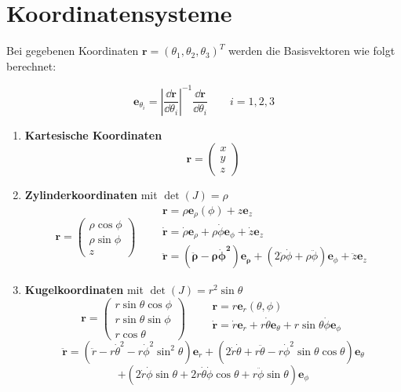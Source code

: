 \section{Koordinatensysteme}

\begin{frameddefn}[Basisvektoren]

Bei gegebenen Koordinaten $\mathbf{r} = ( \theta_1, \theta_2, \theta_3 )^T$ werden die Basisvektoren wie folgt berechnet:

\[ \mathbf{e}_{\theta_{i}} = \left| \frac{\dd \mathbf{r}}{\dd \theta_i} \right|^{-1} \frac{\dd \mathbf{r}}{\dd \theta_i} \qquad i = 1,2,3 \]
	
\end{frameddefn}

\begin{frameddefn}[Koordinatendarstellungen]

\begin{enumerate}
	\item \textbf{Kartesische Koordinaten} \[ \mathbf{r} = \left(\begin{array}{c} x \\ y \\ z \end{array} \right) \]
	\item \textbf{Zylinderkoordinaten} mit $\det(J) = \rho$ \[ \mathbf{r} = \left(\begin{array}{c} \rho \cos \phi \\ \rho \sin \phi \\ z \end{array} \right) \qquad \begin{array}{c} \mathbf{r} = \rho \mathbf{e}_\rho( \phi ) + z \mathbf{e}_z \\ \mathbf{\dot{r}} = \dot{\rho} \mathbf{e}_\rho + \rho \dot{\phi} \mathbf{e}_\phi + \dot{z} \mathbf{e}_z \\ \mathbf{\ddot{r} = (\ddot{\rho} - \rho \dot{\phi}^2) \mathbf{e}_\rho} + (2\dot\rho\dot\phi + \rho \ddot\phi) \mathbf{e}_\phi + \ddot z \mathbf{e}_z \end{array}\]
	\item \textbf{Kugelkoordinaten} mit $\det(J) = r^2 \sin\theta$
		\[ \mathbf{r} = \left(\begin{array}{c} r \sin \theta \cos \phi \\ r \sin \theta \sin \phi \\ r \cos \theta \end{array} \right) \qquad \begin{array}{c} \mathbf{r} = r \mathbf{e}_r( \theta, \phi ) \\ \mathbf{\dot{r}} = \dot{r} \mathbf{e}_r + r \dot{\theta} \mathbf{e}_\theta + r \sin \theta \dot\phi \mathbf{e}_\phi \\  \end{array}\]
		\[ \mathbf{\ddot r}= (\ddot r - r \dot\theta^2 - r \dot\phi^2 \sin^2 \theta)\mathbf{e}_r + (2 \dot r \dot\theta + r \ddot\theta - r \dot\phi^2 \sin\theta\cos\theta)\mathbf{e}_\theta \]
		\[ + (2 \dot r \dot\phi \sin \theta + 2r \dot\theta \dot\phi \cos\theta + r \ddot\phi \sin\theta)\mathbf{e}_\phi \]
\end{enumerate}
	

\end{frameddefn}
